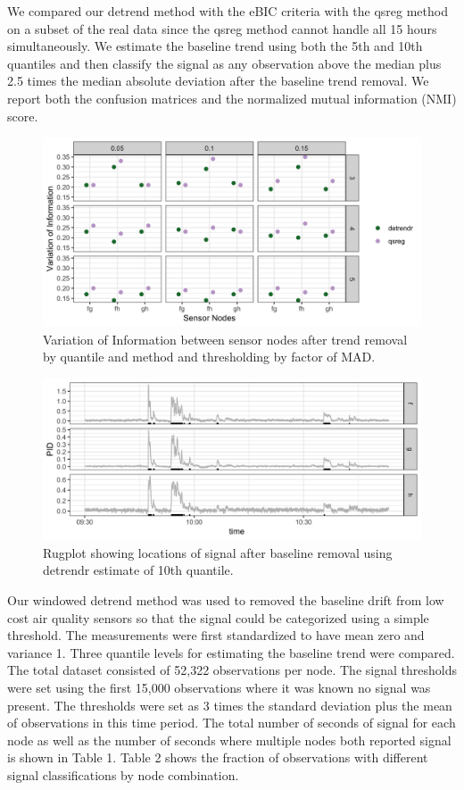 \documentclass[12pt]{article}
\begin{document}
	We compared our detrend method with the eBIC criteria with the qsreg method on a subset of the real data since the qsreg method cannot handle all 15 hours simultaneously. We estimate the baseline trend using both the 5th and 10th quantiles and then classify the signal as any observation above the median plus 2.5 times the median absolute deviation after the baseline trend removal. We report both the confusion matrices and the normalized mutual information (NMI) score. 
	

	
		\begin{figure}
		\centering
		\caption{Variation of Information between sensor nodes after trend removal by quantile and method and thresholding by factor of MAD.}
		\includegraphics[width = .9\linewidth]{Figures/VI_app_short.png}
	\end{figure}
	
	
	\begin{figure}
		\caption{Rugplot showing locations of signal after baseline removal using detrendr estimate of 10th quantile.}
		\includegraphics[width = \linewidth]{Figures/corrected_rugplot.png}
	\end{figure}

	
	Our windowed detrend method was used to removed the baseline drift from low cost air quality sensors so that the signal could be categorized using a simple threshold. The measurements were first standardized to have mean zero and variance 1. Three quantile levels for estimating the baseline trend were compared. The total dataset consisted of 52,322 observations per node. 
	The signal thresholds were set using the first 15,000 observations where it was known no signal was present. The thresholds were set as 3 times the standard deviation plus the mean of observations in this time period. The total number of seconds of signal for each node as well as the number of seconds where multiple nodes both reported signal is shown in Table 1. Table 2 shows the fraction of observations with different signal classifications by node combination. 
	
\end{document}

